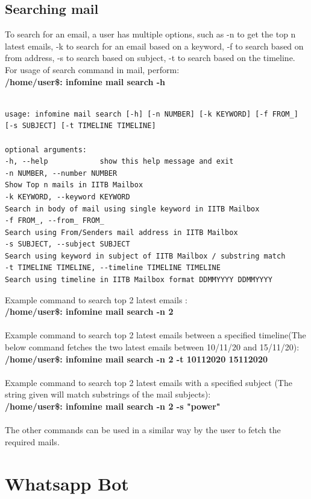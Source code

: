 \documentclass[12pt, a4paper]{article}
\begin{document}
\subsection{Searching mail}
To search for an email, a user has multiple options, such as -n to get the top n latest emails, -k to search for an email based on a keyword, -f to search based on from address, -s to search based on subject, -t to search based on the timeline.
For usage of search command in mail, perform:\\
\textbf{/home/user\$: infomine mail search -h}\\
\\

\begin{verbatim}
usage: infomine mail search [-h] [-n NUMBER] [-k KEYWORD] [-f FROM_] [-s SUBJECT] [-t TIMELINE TIMELINE]

optional arguments:
-h, --help            show this help message and exit
-n NUMBER, --number NUMBER
Show Top n mails in IITB Mailbox
-k KEYWORD, --keyword KEYWORD
Search in body of mail using single keyword in IITB Mailbox
-f FROM_, --from_ FROM_
Search using From/Senders mail address in IITB Mailbox
-s SUBJECT, --subject SUBJECT
Search using keyword in subject of IITB Mailbox / substring match
-t TIMELINE TIMELINE, --timeline TIMELINE TIMELINE
Search using timeline in IITB Mailbox format DDMMYYYY DDMMYYYY
\end{verbatim}
Example command to search top 2 latest emails :\\
\textbf{/home/user\$: infomine mail search -n 2}\\
\\
Example command to search top 2 latest emails between a specified timeline(The below command fetches the two latest emails between 10/11/20 and 15/11/20):\\
\textbf{/home/user\$: infomine mail search -n 2 -t 10112020 15112020}\\
\\
Example command to search top 2 latest emails with a specified subject (The string given will match substrings of the mail subjects):\\
\textbf{/home/user\$: infomine mail search -n 2 -s "power"}\\
\\
The other commands can be used in a similar way by the user to fetch the required mails.

\section{Whatsapp Bot}
\end{document}
